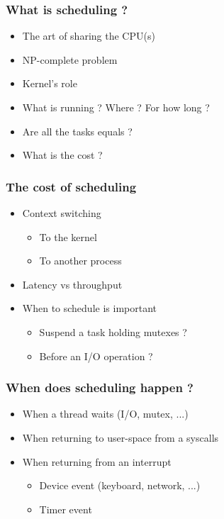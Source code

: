 \begin{frame}
  \frametitle{What is scheduling ?}

  \begin{itemize}
  \item The art of sharing the CPU(s)
  \item NP-complete problem
  \item Kernel's role
  \item What is running ? Where ? For how long ?
  \item Are all the tasks equals ?
  \item What is the cost ?
  \end{itemize}
\end{frame}


\begin{frame}
  \frametitle{The cost of scheduling}

  \begin{itemize}
  \item Context switching
    \begin{itemize}
    \item To the kernel
    \item To another process
    \end{itemize}
  \item Latency vs throughput
  \item When to schedule is important
    \begin{itemize}
    \item Suspend a task holding mutexes ?
    \item Before an I/O operation ?
    \end{itemize}
  \end{itemize}
\end{frame}


\begin{frame}
  \frametitle{When does scheduling happen ?}

  \begin{itemize}
  \item When a thread waits (I/O, mutex, ...)
  \item When returning to user-space from a syscalls
  \item When returning from an interrupt
    \begin{itemize}
    \item Device event (keyboard, network, ...)
    \item Timer event
    \end{itemize}
  \end{itemize}
\end{frame}


